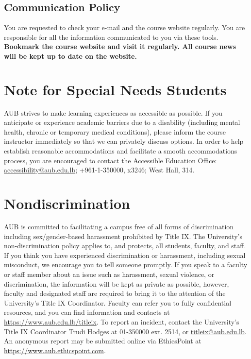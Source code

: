 \documentclass[10pt,a4paper,american]{article}
\begin{document}
\subsection{Communication Policy}
You are requested to check your e-mail and the course website regularly. You are responsible for all the information communicated to you via these tools. \textbf{Bookmark the course website and visit it regularly. All course news will be kept up to date on the website.}

\section{Note for Special Needs Students}
AUB strives to make learning experiences as accessible as possible. If you anticipate or experience academic barriers due to a disability (including mental health, chronic or temporary medical conditions), please inform the course instructor immediately so that we can privately discuss options. In order to help establish reasonable accommodations and facilitate a smooth accommodations process, you are encouraged to contact the Accessible Education Office: \href{mailto:accessibility@aub.edu.lb}{accessibility@aub.edu.lb}; +961-1-350000, x3246; West Hall, 314.

\section{Nondiscrimination}
AUB is committed to facilitating a campus free of all forms of discrimination including sex/gender-based harassment prohibited by Title IX. The University's non-discrimination policy applies to, and protects, all students, faculty, and staff. If you think you have experienced discrimination or harassment, including sexual misconduct, we encourage you to tell someone promptly. If you speak to a faculty or staff member about an issue such as harassment, sexual violence, or discrimination, the information will be kept as private as possible, however, faculty and designated staff are required to bring it to the attention of the University's Title IX Coordinator. Faculty can refer you to fully confidential resources, and you can find information and contacts at \url{https://www.aub.edu.lb/titleix}. To report an incident, contact the University's Title IX Coordinator Trudi Hodges at 01-350000 ext. 2514, or
\href{mailto:titleix@aub.edu.lb}{titleix@aub.edu.lb}. An anonymous report may be submitted online via EthicsPoint at \url{https://www.aub.ethicspoint.com}.
\end{document}
